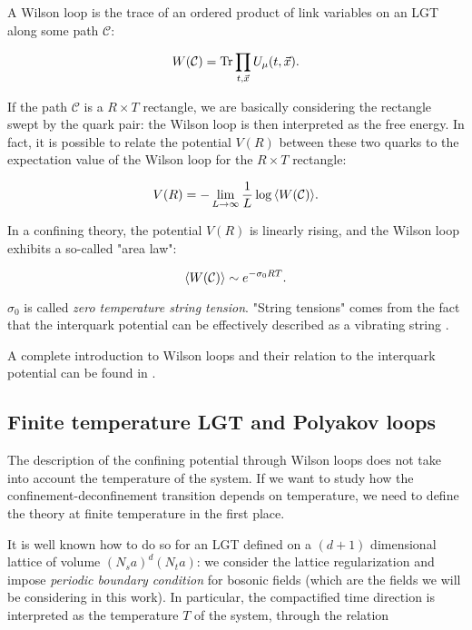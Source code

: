\documentclass[reqno,12pt]{article}
\numberwithin{equation}{section}
\begin{document}
A Wilson loop is the trace of an ordered product of link variables on an LGT along some path $\mathcal{C}$:

\begin{equation}
	W(\mathcal{C}) = \Tr \prod_{t, \vec{x}} U_\mu(t, \vec{x}).
\end{equation}

If the path $\mathcal{C}$ is a $R \times T$ rectangle, we are basically considering the rectangle swept by the quark pair: the Wilson
loop is then interpreted as the free energy. In fact, it is possible to relate the potential $V(R)$ 
between these two quarks to the expectation value of the Wilson loop for the $R \times T$ rectangle:

\begin{equation}
	V(R) = - \lim_{L\rightarrow\infty} \frac{1}{L} \log{\expval{W(\mathcal{C})}}.
\end{equation}

In a confining theory, the potential $V(R)$ is linearly rising, and the Wilson loop exhibits a so-called "area law":

\begin{equation}
	\expval{W(\mathcal{C})} \sim e^{-\sigma_0 R T}.
\end{equation}

$\sigma_0$ is called \textit{zero temperature string tension}. "String tensions" comes from the fact that the interquark 
potential can be effectively described as a vibrating string \cite{caselle}.


A complete introduction to Wilson loops and their relation to the interquark potential can be found in \cite{gattringer}. 

\subsection{Finite temperature LGT and Polyakov loops}
The description of the confining potential through Wilson loops does not take into account the temperature of the system.
If we want to study how the confinement-deconfinement transition depends on temperature, we need to define the theory at finite
temperature in the first place. 

It is well known how to do so for an LGT defined on a $(d+1)$ dimensional lattice of volume $(N_s a)^d(N_t a)$:
we consider the lattice regularization and impose \textit{periodic boundary condition} 
for bosonic fields (which are the fields we will be considering in this work). In particular, the compactified time direction
is interpreted as the temperature $T$ of the system, through the relation
\end{document}
